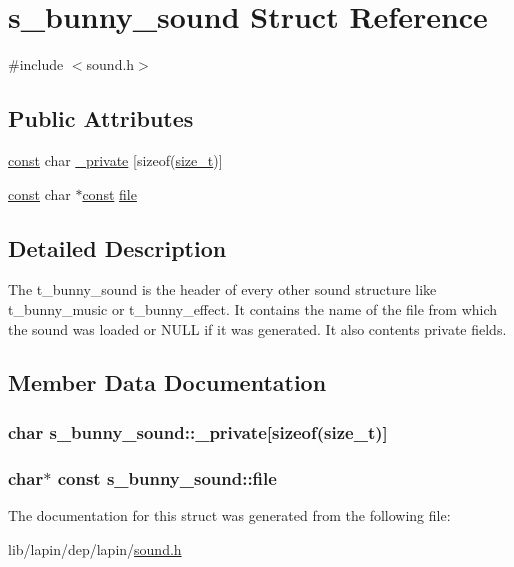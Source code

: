 \hypertarget{structs__bunny__sound}{\section{s\-\_\-bunny\-\_\-sound Struct Reference}
\label{structs__bunny__sound}
}


{\ttfamily \#include $<$sound.\-h$>$}

\subsection*{Public Attributes}
\begin{DoxyCompactItemize}
\item 
\hyperlink{term__entry_8h_a57bd63ce7f9a353488880e3de6692d5a}{const} char \hyperlink{structs__bunny__sound_a1c9162b9a6db227fbbfd31f5b2c4fc58}{\-\_\-private} \mbox{[}sizeof(\hyperlink{nc__alloc_8h_a7b60c5629e55e8ec87a4547dd4abced4}{size\-\_\-t})\mbox{]}
\item 
\hyperlink{term__entry_8h_a57bd63ce7f9a353488880e3de6692d5a}{const} char $\ast$\hyperlink{term__entry_8h_a57bd63ce7f9a353488880e3de6692d5a}{const} \hyperlink{structs__bunny__sound_a684444d74796de38f1e855b661f9a520}{file}
\end{DoxyCompactItemize}


\subsection{Detailed Description}
The t\-\_\-bunny\-\_\-sound is the header of every other sound structure like t\-\_\-bunny\-\_\-music or t\-\_\-bunny\-\_\-effect. It contains the name of the file from which the sound was loaded or N\-U\-L\-L if it was generated. It also contents private fields. 

\subsection{Member Data Documentation}
\hypertarget{structs__bunny__sound_a1c9162b9a6db227fbbfd31f5b2c4fc58}{
\subsubsection[{\-\_\-private}]{ char s\-\_\-bunny\-\_\-sound\-::\-\_\-private\mbox{[}sizeof({\bf size\-\_\-t})\mbox{]}}}\label{structs__bunny__sound_a1c9162b9a6db227fbbfd31f5b2c4fc58}
\hypertarget{structs__bunny__sound_a684444d74796de38f1e855b661f9a520}{
\subsubsection[{file}]{ char$\ast$ {\bf const} s\-\_\-bunny\-\_\-sound\-::file}}\label{structs__bunny__sound_a684444d74796de38f1e855b661f9a520}


The documentation for this struct was generated from the following file\-:\begin{DoxyCompactItemize}
\item 
lib/lapin/dep/lapin/\hyperlink{sound_8h}{sound.\-h}\end{DoxyCompactItemize}
